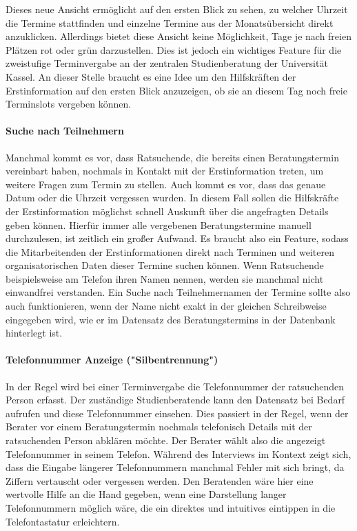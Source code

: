 \documentclass[12pt]{article}
\begin{document}
Dieses neue Ansicht ermöglicht auf den ersten Blick zu sehen, zu welcher
Uhrzeit die Termine stattfinden und einzelne Termine aus der Monatsübersicht
direkt anzuklicken. Allerdings bietet diese Ansicht keine Möglichkeit, Tage je
nach freien Plätzen rot oder grün darzustellen. Dies ist jedoch ein wichtiges
Feature für die zweistufige Terminvergabe an der zentralen Studienberatung der
Universität Kassel. An dieser Stelle braucht es eine Idee um den Hilfskräften
der Erstinformation auf den ersten Blick anzuzeigen, ob sie an diesem Tag noch
freie Terminslots vergeben können.

\paragraph{Suche nach Teilnehmern}
Manchmal kommt es vor, dass Ratsuchende, die bereits einen Beratungstermin
vereinbart haben, nochmals in Kontakt mit der Erstinformation treten, um
weitere Fragen zum Termin zu stellen. Auch kommt es vor, dass das genaue Datum
oder die Uhrzeit vergessen wurden. In diesem Fall sollen die Hilfskräfte der
Erstinformation möglichst schnell Auskunft über die angefragten Details geben
können. Hierfür immer alle vergebenen Beratungstermine manuell durchzulesen,
ist zeitlich ein großer Aufwand. Es braucht also ein Feature, sodass die
Mitarbeitenden der Erstinformationen direkt nach Terminen und weiteren
organisatorischen Daten dieser Termine suchen können. Wenn Ratsuchende
beispielsweise am Telefon ihren Namen nennen, werden sie manchmal nicht
einwandfrei verstanden. Ein Suche nach Teilnehmernamen der Termine sollte also
auch funktionieren, wenn der Name nicht exakt in der gleichen Schreibweise
eingegeben wird, wie er im Datensatz des Beratungstermins in der Datenbank
hinterlegt ist. 

\paragraph{Telefonnummer Anzeige ("Silbentrennung")}
In der Regel wird bei einer Terminvergabe die Telefonnummer der ratsuchenden
Person erfasst. Der zuständige Studienberatende kann den Datensatz bei Bedarf
aufrufen und diese Telefonnummer einsehen. Dies passiert in der Regel, wenn der
Berater vor einem Beratungstermin nochmals telefonisch Details mit der
ratsuchenden Person abklären möchte. Der Berater wählt also die angezeigt
Telefonnummer in seinem Telefon. Während des Interviews im Kontext zeigt sich,
dass die Eingabe längerer Telefonnummern manchmal Fehler mit sich bringt, da
Ziffern vertauscht oder vergessen werden. Den Beratenden wäre hier eine
wertvolle Hilfe an die Hand gegeben, wenn eine Darstellung langer
Telefonnummern möglich wäre, die ein direktes und intuitives eintippen in die
Telefontastatur erleichtern. 
\end{document}

